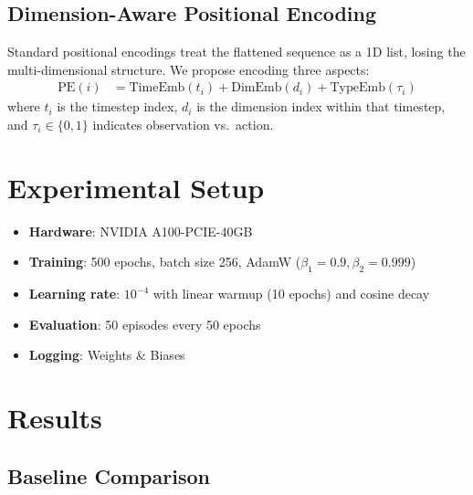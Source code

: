 \documentclass[11pt,a4paper]{article}
\begin{document}
\subsection{Dimension-Aware Positional Encoding}

Standard positional encodings treat the flattened sequence as a 1D list, losing the multi-dimensional structure. We propose encoding three aspects:
\begin{align}
    \text{PE}(i) &= \text{TimeEmb}(t_i) + \text{DimEmb}(d_i) + \text{TypeEmb}(\tau_i)
\end{align}
where $t_i$ is the timestep index, $d_i$ is the dimension index within that timestep, and $\tau_i \in \{0, 1\}$ indicates observation vs.\ action.

\section{Experimental Setup}

\begin{itemize}[noitemsep]
    \item \textbf{Hardware}: NVIDIA A100-PCIE-40GB
    \item \textbf{Training}: 500 epochs, batch size 256, AdamW ($\beta_1=0.9, \beta_2=0.999$)
    \item \textbf{Learning rate}: $10^{-4}$ with linear warmup (10 epochs) and cosine decay
    \item \textbf{Evaluation}: 50 episodes every 50 epochs
    \item \textbf{Logging}: Weights \& Biases
\end{itemize}

\section{Results}

\subsection{Baseline Comparison}
\end{document}
